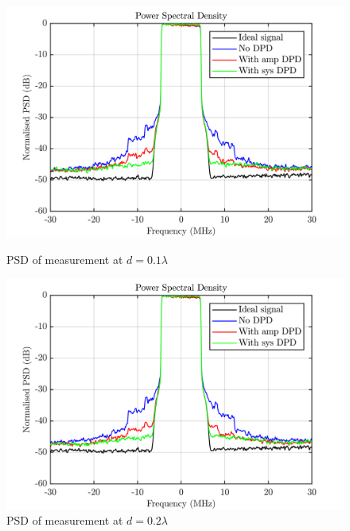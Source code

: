 \begin{figure}[H]
  \centering
  \begin{minipage}[b]{0.5\textwidth}
	\includegraphics[scale = 0.5]{figures/measurement/cree/meas3/psd_0p1.png}
	\caption{PSD of measurement at $d = 0.1\lambda$ }	
    \label{fig:meas4_psd1}
  \end{minipage}
  \hfill
  \begin{minipage}[b]{0.4\textwidth}
	\includegraphics[scale = 0.5]{figures/measurement/cree/meas3/psd_0p2.png}
	\caption{PSD of measurement at $d = 0.2\lambda$}
    \label{fig:meas4_psd2}
  \end{minipage}
\end{figure}

